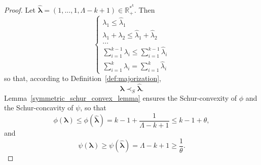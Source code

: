 \documentclass[twoside,11pt]{book}
\numberwithin{theorem}{chapter}
\numberwithin{definition}{chapter}
\numberwithin{proposition}{chapter}
\numberwithin{corollary}{chapter}
\numberwithin{example}{chapter}
\numberwithin{lemma}{chapter}
\numberwithin{assumption}{chapter}
\begin{document}
\begin{proof}
Let $\hat{\bm{\lambda}} = (1,...,1,\Lambda -k +1) \in \mathbb{R}_{+}^{*^{k}}$. Then
\begin{equation}
\left\{
    \begin{array}{ll}
        \lambda_{1} \leq \hat{\lambda}_{1} \\
        \lambda_{1} + \lambda_{2} \leq \hat{\lambda}_{1} + \hat{\lambda}_{2} \\
        ... \\
        \sum\limits_{i=1}^{k-1} \lambda_{i} \leq \sum\limits_{i=1}^{k-1} \hat{\lambda}_{i}\\
        \sum\limits_{i=1}^{k} \lambda_{i} = \sum\limits_{i=1}^{k} \hat{\lambda}_{i}
    \end{array}
\right.
\end{equation}
so that, according to Definition~\ref{def:majorization},
\begin{equation}
    \bm{\lambda} \prec_{S} \hat{\bm{\lambda}}.
\end{equation}
Lemma~\ref{symmetric_schur_convex_lemma} ensures the Schur-convexity of $\phi$ and the Schur-concavity of $\psi$, so that
$$\phi(\bm{\lambda})  \leq \phi(\hat{\bm{\lambda}}) = k-1 + \frac{1}{\Lambda - k +1} \leq k-1+\theta,$$
and
$$\psi(\bm{\lambda}) \geq \psi(\hat{\bm{\lambda}}) = \Lambda - k +1\geq \frac{1}{\theta}.$$
\end{proof}



\end{document}
